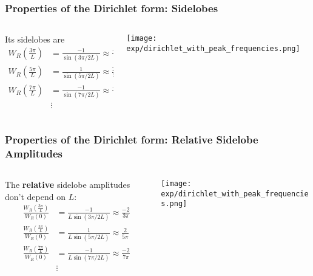 \documentclass{beamer}
\begin{document}
\begin{frame}
  \frametitle{Properties of the Dirichlet form: Sidelobes}

  \begin{columns}
    \begin{column}{0.5\textwidth}

      Its sidelobes are
      \begin{align*}      
        W_R\left(\frac{3\pi}{L}\right) &= \frac{-1}{\sin(3\pi/2L)}\approx \frac{-2L}{3\pi}\\
        W_R\left(\frac{5\pi}{L}\right) &= \frac{1}{\sin(5\pi/2L)}\approx \frac{2L}{5\pi}\\
        W_R\left(\frac{7\pi}{L}\right) &= \frac{-1}{\sin(7\pi/2L)}\approx \frac{-2L}{7\pi}\\
        & \vdots
      \end{align*}
    \end{column}
    \begin{column}{0.5\textwidth}
      \centerline{\texttt{[image: exp/dirichlet\_with\_peak\_frequencies.png]}}
    \end{column}
  \end{columns}
\end{frame}

\begin{frame}
  \frametitle{Properties of the Dirichlet form: Relative Sidelobe Amplitudes}

  \begin{columns}
    \begin{column}{0.5\textwidth}

      The {\bf relative} sidelobe amplitudes don't depend on $L$:
      \begin{align*}      
        \frac{W_R\left(\frac{3\pi}{L}\right)}{W_R(0)} &=
        \frac{-1}{L\sin(3\pi/2L)}\approx \frac{-2}{3\pi}\\
        \frac{W_R\left(\frac{5\pi}{L}\right)}{W_R(0)} &=
        \frac{1}{L\sin(5\pi/2L)}\approx \frac{2}{5\pi}\\
        \frac{W_R\left(\frac{7\pi}{L}\right)}{W_R(0)} &=
        \frac{-1}{L\sin(7\pi/2L)}\approx \frac{-2}{7\pi}\\
        & \vdots
      \end{align*}
    \end{column}
    \begin{column}{0.5\textwidth}
      \centerline{\texttt{[image: exp/dirichlet\_with\_peak\_frequencies.png]}}
    \end{column}
  \end{columns}
\end{frame}
\end{document}
